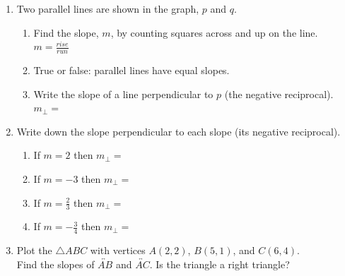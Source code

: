 \begin{enumerate}
\item Two parallel lines are shown in the graph, $p$ and $q$.
\begin{multicols}{2}
    \begin{enumerate}[itemsep=1cm]
      \item Find the slope, $m$, by counting squares across and up on the line. \\[0.5cm]
      $\displaystyle m = \frac{rise}{run}$\\[0.5cm]
      \item True or false: parallel lines have equal slopes.
      \item Write the slope of a line perpendicular to $p$ (the negative reciprocal).\\[0.25cm]
      $m_{\perp}=$
      \end{enumerate}
    \begin{flushright}
    \end{flushright}
\end{multicols}

\item Write down the slope perpendicular to each slope (its negative reciprocal).
\begin{enumerate}[itemsep=0.9cm]
  \item If $m = 2$ then $m_{\perp}=$
  \item If $m = -3$ then $m_{\perp}=$
  \item If $\displaystyle m = \frac{2}{3}$ then $m_{\perp}=$
  \item If $\displaystyle m = -\frac{3}{4}$ then $m_{\perp}=$
\end{enumerate}

\item Plot the $\triangle ABC$ with vertices $A(2,2)$, $B(5,1)$, and $C(6,4)$. \\[0.5cm]
Find the slopes of $\overleftrightarrow{AB}$ and $\overleftrightarrow{AC}$. Is the triangle a right triangle?
  \begin{center}
    \end{center}


\end{enumerate}
